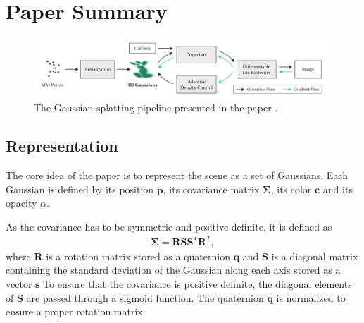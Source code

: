 

\section{Paper Summary}

\begin{figure}
    \centering
    \includegraphics[width=\textwidth]{images/pipeline.png}
    \caption{The Gaussian splatting pipeline presented in the paper \cite[Fig. 2]{kerbl3DGaussianSplatting2023}.}
\end{figure}


\subsection{Representation}
The core idea of the paper is to represent the scene as a set of Gaussians.
Each Gaussian is defined by its position $\bm{p}$, its covariance matrix $\bm{\Sigma}$, its color $\bm{c}$ and its opacity $\alpha$.

As the covariance has to be symmetric and positive definite, it is defined as
\begin{align}
    \bm{\Sigma} = \bm{R} \bm{S} \bm{S}^T \bm{R}^T,
\end{align}
where $\bm{R}$ is a rotation matrix stored as a quaternion $\bm{q}$ and $\bm{S}$ is a diagonal matrix containing the standard deviation of the Gaussian along each axis stored as a vector $\bm{s}$
To ensure that the covariance is positive definite, the diagonal elements of $\bm{S}$ are passed through a sigmoid function.
The quaternion $\bm{q}$ is normalized to ensure a proper rotation matrix.



